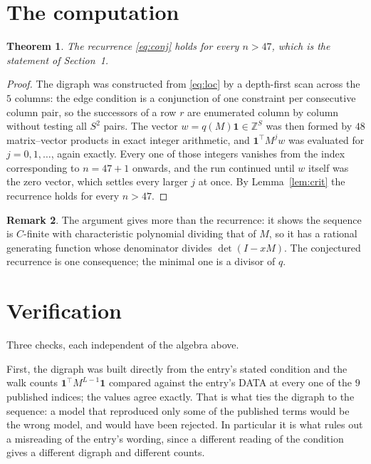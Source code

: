\documentclass[11pt,a4paper]{article}
\theoremstyle{plain}
\newtheorem{theorem}{Theorem}
\theoremstyle{definition}
\newtheorem{remark}[theorem]{Remark}
\begin{document}
\section{The computation}

\begin{theorem}
The recurrence \eqref{eq:conj} holds for every $n>47$, which is the statement of
Section~1.
\end{theorem}

\begin{proof}
The digraph was constructed from \eqref{eq:loc} by a depth-first scan across the $5$
columns: the edge condition is a conjunction of one constraint per consecutive column
pair, so the successors of a row $r$ are enumerated column by column without testing all
$S^2$ pairs. The vector $w=q(M)\mathbf{1}\in\mathbb{Z}^{S}$ was then formed by $48$
matrix--vector products in exact integer arithmetic, and $\mathbf{1}^{\!\top}M^{j}w$ was
evaluated for $j=0,1,\dots$, again exactly. Every one of those integers vanishes from the
index corresponding to $n=47+1$ onwards, and the run continued until $w$ itself was the
zero vector, which settles every larger $j$ at once. By Lemma~\ref{lem:crit} the recurrence
holds for every $n>47$.
\end{proof}

\begin{remark}
The argument gives more than the recurrence: it shows the sequence is $C$-finite with
characteristic polynomial dividing that of $M$, so it has a rational generating function
whose denominator divides $\det(I-xM)$. The conjectured recurrence is one consequence; the
minimal one is a divisor of $q$.
\end{remark}

\section{Verification}

Three checks, each independent of the algebra above.

First, the digraph was built directly from the entry's stated condition and the walk counts
$\mathbf{1}^{\!\top}M^{L-1}\mathbf{1}$ compared against the entry's DATA at
every one of the $9$ published indices; the values agree exactly. That is what ties
the digraph to the sequence: a model that reproduced only some of the published terms would
be the wrong model, and would have been rejected. In particular it is what rules out a
misreading of the entry's wording, since a different reading of the condition gives a
different digraph and different counts.
\end{document}
